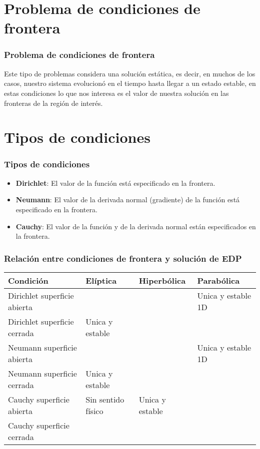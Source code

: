 \section{Problema de condiciones de frontera}
\begin{frame}
\frametitle{Problema de condiciones de frontera}
Este tipo de problemas considera una solución estática, es decir, en muchos de los casos, nuestro sistema evolucionó en el tiempo hasta llegar a un estado estable, en estas condiciones lo que nos interesa es el valor de nuestra solución en las fronteras de la región de interés.
\end{frame}
\section{Tipos de condiciones}
\begin{frame}
\frametitle{Tipos de condiciones}
\begin{itemize}
\item \textbf{Dirichlet}: El valor de la función está especificado en la frontera.
\item \textbf{Neumann}: El valor de la derivada normal (gradiente) de la función está especificado en la frontera.
\item \textbf{Cauchy}: El valor de la función y de la derivada normal están especificados en la frontera.
\end{itemize}
\end{frame}
\begin{frame}
\frametitle{Relación entre condiciones de frontera y solución de EDP}
\fontsize{8}{8}\selectfont
\begin{tabular}{p{2cm} | l l l}
	Condición                & Elíptica & Hiperbólica & Parabólica \\ \hline
	Dirichlet superficie abierta &              &                 & Unica y estable 1D \\ \hline
	Dirichlet superficie cerrada & Unica y estable &                 &  \\ \hline
	Neumann superficie abierta &              &                 & Unica y estable 1D \\ \hline
	Neumann superficie cerrada & Unica y estable &                 & \\ \hline
	Cauchy superficie abierta &  Sin sentido físico            & Unica y estable &  \\ \hline
	Cauchy superficie cerrada &              &                 &  \\ \hline
\end{tabular}
\end{frame}
